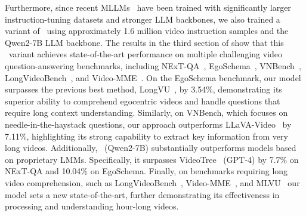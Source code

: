 Furthermore, since recent MLLMs~\cite{li2024llava, liu2024kangaroo, shu2024video, shen2024longvu, wang2024qwen2, zhang2024video} have been trained with significantly larger instruction-tuning datasets and stronger LLM backbones, we also trained a variant of \modelLlava\ using approximately 1.6 million video instruction samples and the Qwen2-7B LLM backbone. The results in the third section of  show that this \modelLlava\ variant achieves state-of-the-art performance on multiple challenging video question-answering benchmarks, including NExT-QA~\cite{xiao2021nextqa}, EgoSchema~\cite{mangalam2023egoschema}, VNBench~\cite{zhao2024needle}, LongVideoBench~\cite{wu2024longvideobench}, and Video-MME~\cite{fu2024video}. On the EgoSchema benchmark, our model surpasses the previous best method, LongVU~\cite{shen2024longvu}, by 3.54\%, demonstrating its superior ability to comprehend egocentric videos and handle questions that require long context understanding. Similarly, on VNBench, which focuses on needle-in-the-haystack questions, our approach outperforms LLaVA-Video~\cite{zhang2024video} by 7.11\%, highlighting its strong capability to extract key information from very long videos. Additionally, \modelLlava\ (Qwen2-7B) substantially outperforms models based on proprietary LMMs. Specifically, it surpasses VideoTree~\cite{wang2024videotree} (GPT-4) by 7.7\% on NExT-QA and 10.04\% on EgoSchema. Finally, on benchmarks requiring long video comprehension, such as LongVideoBench~\cite{wu2024longvideobench}, Video-MME~\cite{fu2024video}, and MLVU~\cite{zhou2024mlvu} our model sets a new state-of-the-art, further demonstrating its effectiveness in processing and understanding hour-long videos.
